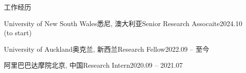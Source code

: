 \documentclass{resume} %
\begin{document}
\begin{rSection}{工作经历}
\begin{rSubsection}{University of New South Wales}{悉尼, 澳大利亚}{Senior Research Assocaite}{2024.10 (to start)}
\end{rSubsection}
\begin{rSubsection}{University of Auckland}{奥克兰, 新西兰}{Research Fellow}{2022.09 -- 至今}
\end{rSubsection}
	\begin{rSubsection}{阿里巴巴达摩院}{北京, 中国}{Research Intern}{2020.09 -- 2021.07}
\end{rSubsection}
\end{rSection}
\end{document}
